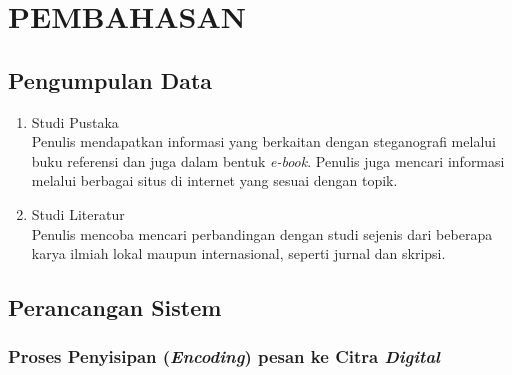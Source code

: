 
\chapter{PEMBAHASAN}

\section{Pengumpulan Data}
\begin{enumerate}
	\item Studi Pustaka\\
	Penulis mendapatkan informasi yang berkaitan dengan steganografi melalui buku referensi dan juga dalam bentuk \emph{e-book}. Penulis juga mencari informasi melalui berbagai situs di internet yang sesuai dengan topik.	
	\item Studi Literatur\\
	Penulis mencoba mencari perbandingan dengan studi sejenis dari beberapa karya ilmiah lokal maupun internasional, seperti jurnal dan skripsi.	 
\end{enumerate}

\section{Perancangan Sistem}

	\subsection{Proses Penyisipan (\emph{Encoding}) pesan ke Citra \emph{Digital}}
	
